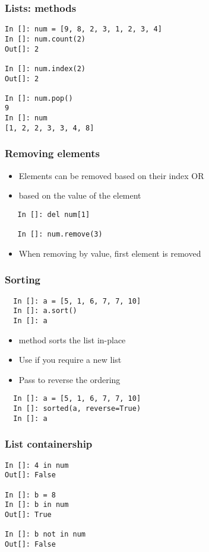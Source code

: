\documentclass[14pt,compress]{beamer}
\begin{document}
\begin{frame}[fragile]
  \frametitle{Lists: methods}
  \begin{lstlisting}
In []: num = [9, 8, 2, 3, 1, 2, 3, 4]
In []: num.count(2)
Out[]: 2

In []: num.index(2)
Out[]: 2

In []: num.pop()
9
In []: num
[1, 2, 2, 3, 3, 4, 8]
  \end{lstlisting}
\end{frame}

\begin{frame}[fragile]
  \frametitle{Removing elements}
\begin{itemize}
  \item Elements can be removed based on their index OR
  \item based on the value of the element
  \end{itemize}
  \begin{lstlisting}
   In []: del num[1]

   In []: num.remove(3)
  \end{lstlisting}
  \begin{itemize}
  \item \alert{When removing by value, first element is removed}
  \end{itemize}
\end{frame}

\begin{frame}[fragile]
  \frametitle{Sorting}
  \begin{lstlisting}
  In []: a = [5, 1, 6, 7, 7, 10]
  In []: a.sort()
  In []: a
  \end{lstlisting}
  \begin{itemize}
  \item {} method sorts the list in-place
  \item Use  if you require a new list
  \item Pass  to reverse the ordering
  \end{itemize}
  \begin{lstlisting}
  In []: a = [5, 1, 6, 7, 7, 10]
  In []: sorted(a, reverse=True)
  In []: a
  \end{lstlisting}
\end{frame}

\begin{frame}[fragile]
\frametitle{List containership}
\begin{lstlisting}
In []: 4 in num
Out[]: False

In []: b = 8
In []: b in num
Out[]: True

In []: b not in num
Out[]: False
\end{lstlisting}
\end{frame}
\end{document}
